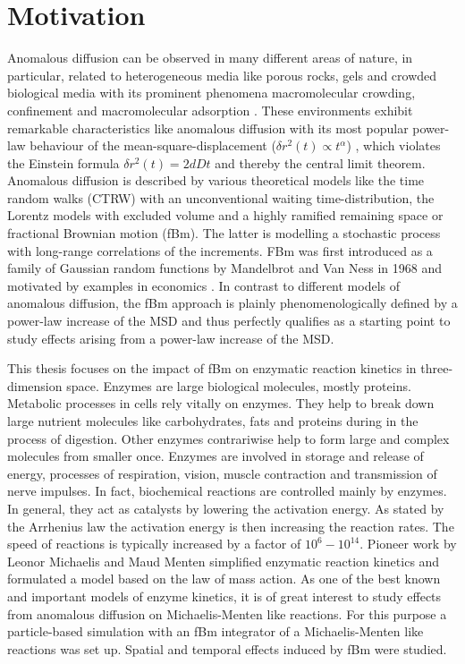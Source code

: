 \documentclass[
  a4paper,BCOR10mm,oneside,
  headsepline,footsepline,%
  fleqn,openbib
]{scrbook}
\begin{document}
\chapter*{Motivation}
Anomalous diffusion can be observed in many different areas of nature, in particular, related to heterogeneous media like porous rocks, gels and crowded biological media with its prominent phenomena macromolecular crowding, confinement and macromolecular adsorption \cite{Minton2006}. These environments exhibit remarkable characteristics like anomalous diffusion with its most popular power-law behaviour of the mean-square-displacement ($\delta r^2(t)\propto t^{\alpha}$) \cite{Hofling2013}, which violates the Einstein formula $\delta r^2(t)=2 d D t$ and thereby the central limit theorem. Anomalous diffusion is described by various theoretical models like the time random walks (CTRW) with an unconventional waiting time-distribution, the Lorentz models with excluded volume and a highly ramified remaining space  or fractional Brownian motion (fBm). The latter is modelling a stochastic process with long-range correlations of the increments. FBm was first introduced as a family of Gaussian random functions by Mandelbrot and Van Ness in 1968 and motivated by examples in economics \cite{Mandelbrot1968}. In contrast to different models of anomalous diffusion, the fBm approach is plainly phenomenologically defined by a power-law increase of the MSD and thus perfectly qualifies as a starting point to study effects arising from a power-law increase of the MSD. \par This thesis focuses on the impact of fBm on enzymatic reaction kinetics in three-dimension space. Enzymes are large biological molecules, mostly proteins. Metabolic processes in cells rely vitally on enzymes. They help to break down large nutrient molecules like carbohydrates, fats and proteins during in the process of digestion. Other enzymes contrariwise help to form large and complex molecules from smaller once. Enzymes are involved in storage and release of energy, processes of respiration, vision, muscle contraction and transmission of nerve impulses. In fact, biochemical reactions are controlled mainly by enzymes. In general, they act as catalysts by lowering the activation energy. As stated by the Arrhenius law the activation energy is then increasing the reaction rates. The speed of reactions is typically increased by a factor of $10^6-10^{14}$. Pioneer work by Leonor Michaelis and Maud Menten \cite{michaelis1913kinetik} simplified enzymatic reaction kinetics and formulated a model based on the law of mass action. As one of the best known and important models of enzyme kinetics, it is of great interest to study effects from anomalous diffusion on Michaelis-Menten like reactions. For this purpose a particle-based simulation with an fBm integrator of a Michaelis-Menten like reactions was set up. Spatial and temporal effects induced by fBm were studied. 
\end{document}
